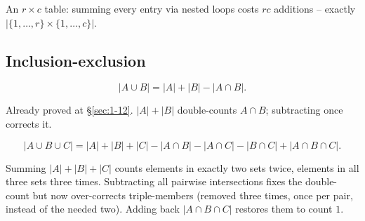 \begin{example}
An $r\times c$ table: summing every entry via nested loops costs $rc$ additions -- exactly $|\{1,\dots,r\}\times\{1,\dots,c\}|$.
\end{example}

\subsection{Inclusion-exclusion}
\label{sec:8-3}

\begin{proposition}
\[
|A\cup B| = |A|+|B|-|A\cap B|.
\]
\end{proposition}
\begin{note}
Already proved at \S\ref{sec:1-12}. $|A|+|B|$ double-counts $A\cap B$; subtracting once corrects it.
\end{note}

\begin{proposition}
\[
|A\cup B\cup C| = |A|+|B|+|C| - |A\cap B|-|A\cap C|-|B\cap C| + |A\cap B\cap C|.
\]
\end{proposition}
\begin{note}
Summing $|A|+|B|+|C|$ counts elements in exactly two sets twice, elements in all three sets three times. Subtracting all pairwise intersections fixes the double-count but now over-corrects triple-members (removed three times, once per pair, instead of the needed two). Adding back $|A\cap B\cap C|$ restores them to count $1$.
\end{note}

